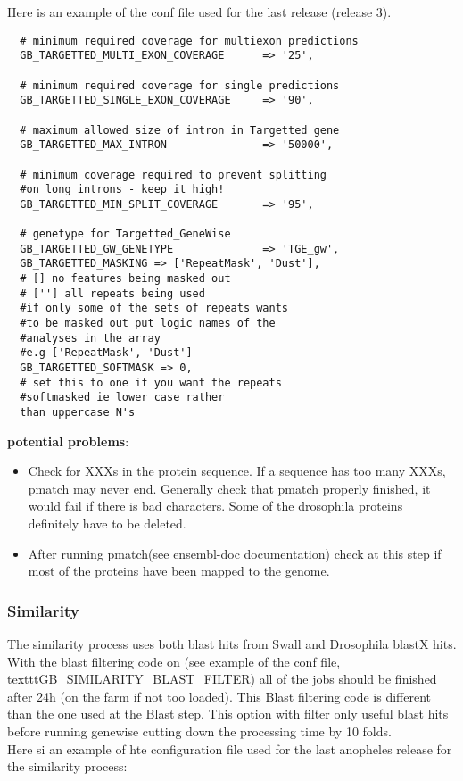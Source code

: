 \documentclass[a4paper,10pt]{article}
\begin{document}
Here is an example of the conf file used for the last release (release 3).%
\begin{verbatim}
  # minimum required coverage for multiexon predictions
  GB_TARGETTED_MULTI_EXON_COVERAGE      => '25',
  
  # minimum required coverage for single predictions
  GB_TARGETTED_SINGLE_EXON_COVERAGE     => '90',
  
  # maximum allowed size of intron in Targetted gene
  GB_TARGETTED_MAX_INTRON               => '50000',
  
  # minimum coverage required to prevent splitting 
  #on long introns - keep it high!
  GB_TARGETTED_MIN_SPLIT_COVERAGE       => '95',
  
  # genetype for Targetted_GeneWise
  GB_TARGETTED_GW_GENETYPE              => 'TGE_gw',       
  GB_TARGETTED_MASKING => ['RepeatMask', 'Dust'],
  # [] no features being masked out
  # [''] all repeats being used 
  #if only some of the sets of repeats wants 
  #to be masked out put logic names of the 
  #analyses in the array 
  #e.g ['RepeatMask', 'Dust']
  GB_TARGETTED_SOFTMASK => 0, 
  # set this to one if you want the repeats 
  #softmasked ie lower case rather 
  than uppercase N's
\end{verbatim}

\textbf{potential problems}:
\begin{itemize}
\item Check for XXXs in the protein sequence. If a sequence has too many XXXs, pmatch may never end. Generally check that pmatch properly finished, it would fail if there is bad characters. Some of the drosophila proteins definitely have to be deleted.
\item After running pmatch(see ensembl-doc documentation) check at this step if most of the proteins have been mapped to the genome. 
\end{itemize}

\subsubsection{Similarity}
The similarity process uses both blast hits from Swall and Drosophila blastX hits. With the blast filtering code on (see example of the conf file, texttt{GB\_SIMILARITY\_BLAST\_FILTER)} all of the jobs should be finished after 24h (on the farm if not too loaded). This Blast filtering code is different than the one used at the Blast step. This option with filter only useful blast hits before running genewise cutting down the processing time by 10 folds.
\\
Here si an example of hte configuration file used for the last anopheles release for the similarity process:
\end{document}

